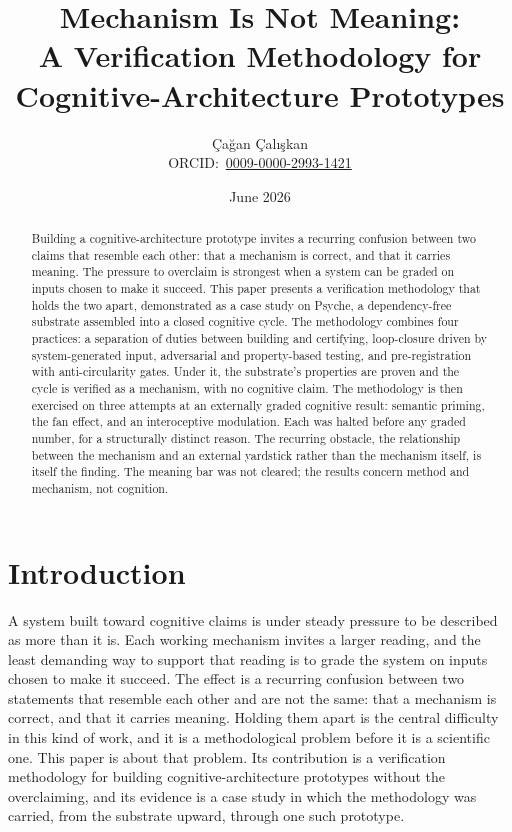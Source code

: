 \documentclass[11pt]{article}
\title{Mechanism Is Not Meaning:\\[2pt]
       A Verification Methodology for Cognitive-Architecture Prototypes}
\author{%
  Çağan Çalışkan\authororcidicon \\[4pt]
  \normalsize ORCID:~\href{https://orcid.org/0009-0000-2993-1421}{0009-0000-2993-1421}%
}
\date{June 2026}
\begin{document}
\maketitle

\begin{abstract}
Building a cognitive-architecture prototype invites a recurring confusion between two claims
that resemble each other: that a mechanism is correct, and that it carries meaning. The
pressure to overclaim is strongest when a system can be graded on inputs chosen to make it
succeed. This paper presents a verification methodology that holds the two apart,
demonstrated as a case study on Psyche, a dependency-free substrate assembled into a closed
cognitive cycle. The methodology combines four practices: a separation of duties between
building and certifying, loop-closure driven by system-generated input, adversarial and
property-based testing, and pre-registration with anti-circularity gates. Under it, the
substrate's properties are proven and the cycle is verified as a mechanism, with no
cognitive claim. The methodology is then exercised on three attempts at an externally graded
cognitive result: semantic priming, the fan effect, and an interoceptive modulation. Each
was halted before any graded number, for a structurally distinct reason. The recurring
obstacle, the relationship between the mechanism and an external yardstick rather than the
mechanism itself, is itself the finding. The meaning bar was not cleared; the results concern
method and mechanism, not cognition.
\end{abstract}

\section{Introduction}\label{sec:intro}

A system built toward cognitive claims is under steady pressure to be described as more
than it is. Each working mechanism invites a larger reading, and the least demanding way
to support that reading is to grade the system on inputs chosen to make it succeed. The
effect is a recurring confusion between two statements that resemble each other and are not
the same: that a mechanism is correct, and that it carries meaning. Holding them apart is
the central difficulty in this kind of work, and it is a methodological problem before it
is a scientific one. This paper is about that problem. Its contribution is a verification
methodology for building cognitive-architecture prototypes without the overclaiming, and
its evidence is a case study in which the methodology was carried, from the substrate
upward, through one such prototype.
\end{document}
